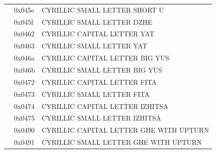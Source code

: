 \documentclass[12pt, twoside]{article}
\begin{document}
\begin{longtable}{L{1.0cm} L{2.0cm} >{\footnotesize}L{10cm}}
&0x045e&CYRILLIC SMALL LETTER SHORT U\\
&0x045f&CYRILLIC SMALL LETTER DZHE\\
&0x0462&CYRILLIC CAPITAL LETTER YAT\\
&0x0463&CYRILLIC SMALL LETTER YAT\\
&0x046a&CYRILLIC CAPITAL LETTER BIG YUS\\
&0x046b&CYRILLIC SMALL LETTER BIG YUS\\
&0x0472&CYRILLIC CAPITAL LETTER FITA\\
&0x0473&CYRILLIC SMALL LETTER FITA\\
&0x0474&CYRILLIC CAPITAL LETTER IZHITSA\\
&0x0475&CYRILLIC SMALL LETTER IZHITSA\\
&0x0490&CYRILLIC CAPITAL LETTER GHE WITH UPTURN\\
&0x0491&CYRILLIC SMALL LETTER GHE WITH UPTURN\\


\end{longtable}
\end{document}
